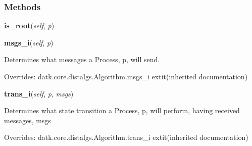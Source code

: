
  \subsubsection{Methods}

    \label{datk:core:algs:SynchConvergecast:is_root}

    \vspace{0.5ex}

\hspace{.8\funcindent}\begin{boxedminipage}{\funcwidth}

    \raggedright \textbf{is\_root}(\textit{self}, \textit{p})

\setlength{\parskip}{2ex}
\setlength{\parskip}{1ex}
    \end{boxedminipage}

    \vspace{0.5ex}

\hspace{.8\funcindent}\begin{boxedminipage}{\funcwidth}

    \raggedright \textbf{msgs\_i}(\textit{self}, \textit{p})

\setlength{\parskip}{2ex}
    Determines what messages a Process, p, will send.

\setlength{\parskip}{1ex}
      Overrides: datk.core.distalgs.Algorithm.msgs\_i 	extit{(inherited documentation)}

    \end{boxedminipage}

    \vspace{0.5ex}

\hspace{.8\funcindent}\begin{boxedminipage}{\funcwidth}

    \raggedright \textbf{trans\_i}(\textit{self}, \textit{p}, \textit{msgs})

\setlength{\parskip}{2ex}
    Determines what state transition a Process, p, will perform, having 
    received messages, msgs

\setlength{\parskip}{1ex}
      Overrides: datk.core.distalgs.Algorithm.trans\_i 	extit{(inherited documentation)}

    \end{boxedminipage}

